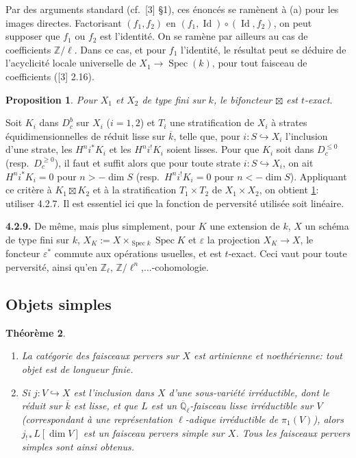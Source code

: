 \documentclass[12pt,a4paper]{article}
\theoremstyle{plain}
\newtheorem{theorem}{Th\'{e}or\`{e}me}[section]
\newtheorem{proposition}[theorem]{Proposition}
\theoremstyle{definition}
\DeclareMathOperator{\Id}{Id}
\DeclareMathOperator{\Spec}{Spec}
\newcommand{\into}{\hookrightarrow}
\providecommand{\Spec}{\operatorname{Spec}}
\begin{document}
Par des arguments standard (cf.\ [3] \S1), ces \'{e}nonc\'{e}s se ram\`{e}nent \`{a} (a) pour les images directes. Factorisant $(f_{1}, f_{2})$ en $(f_{1}, \Id) \circ (\Id, f_{2})$, on peut supposer que $f_{1}$ ou $f_{2}$ est l'identit\'{e}. On se ram\`{e}ne par ailleurs au cas de coefficients $\mathbb{Z}/\ell$. Dans ce cas, et pour $f_{1}$ l'identit\'{e}, le r\'{e}sultat peut se d\'{e}duire de l'acyclicit\'{e} locale universelle de $X_{1} \to \Spec(k)$, pour tout faisceau de coefficients ([3] 2.16).

\begin{proposition}\label{prop:4.2.8}
Pour $X_{1}$ et $X_{2}$ de type fini sur $k$, le bifoncteur $\boxtimes$ est $t$-exact.
\end{proposition}

Soit $K_{i}$ dans $D_{c}^{b}$ sur $X_{i}$ ($i=1,2$) et $T_{i}$ une stratification de $X_{i}$ \`{a} strates \'{e}quidimensionnelles de r\'{e}duit lisse sur $\overline{k}$, telle que, pour $i: S \into X_{i}$ l'inclusion d'une strate, les $H^{n}i^{*}K_{i}$ et les $H^{n}i^{!}K_{i}$ soient lisses. Pour que $K_{i}$ soit dans $D_{c}^{\leq 0}$ (resp.\ $D_{c}^{\geq 0}$), il faut et suffit alors que pour toute strate $i: S \into X_{i}$, on ait $H^{n}i^{*}K_{i} = 0$ pour $n > -\dim S$ (resp.\ $H^{n}i^{!}K_{i} = 0$ pour $n < -\dim S$). Appliquant ce crit\`{e}re \`{a} $K_{1} \boxtimes K_{2}$ et \`{a} la stratification $T_{1} \times T_{2}$ de $X_{1} \times X_{2}$, on obtient \ref{prop:4.2.8}: utiliser 4.2.7. Il est essentiel ici que la fonction de perversit\'{e} utilis\'{e}e soit lin\'{e}aire.

\noindent\textbf{4.2.9.} De m\^{e}me, mais plus simplement, pour $K$ une extension de $k$, $X$ un sch\'{e}ma de type fini sur $k$, $X_{K} := X \times_{\Spec k} \Spec K$ et $\varepsilon$ la projection $X_{K} \to X$, le foncteur $\varepsilon^{*}$ commute aux op\'{e}rations usuelles, et est $t$-exact. Ceci vaut pour toute perversit\'{e}, ainsi qu'en $\mathbb{Z}_{\ell}$, $\mathbb{Z}/\ell^{n}$,$\ldots$-cohomologie.


\subsection{Objets simples}

\begin{theorem}\label{thm:4.3.1}
\begin{enumerate}
\item[(i)] La cat\'{e}gorie des faisceaux pervers sur $X$ est artinienne et noeth\'{e}rienne: tout objet est de longueur finie.
\item[(ii)] Si $j: V \into X$ est l'inclusion dans $X$ d'une sous-vari\'{e}t\'{e} irr\'{e}ductible, dont le r\'{e}duit sur $\overline{k}$ est lisse, et que $L$ est un $\overline{\mathbb{Q}}_{\ell}$-faisceau lisse irr\'{e}ductible sur $V$ (correspondant \`{a} une repr\'{e}sentation $\ell$-adique irr\'{e}ductible de $\pi_{1}(V)$), alors $j_{!*}L[\dim V]$ est un faisceau pervers simple sur $X$. Tous les faisceaux pervers simples sont ainsi obtenus.
\end{enumerate}
\end{theorem}
\end{document}

